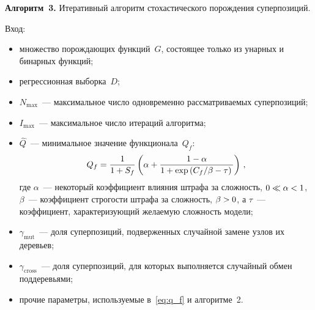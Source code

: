 \begin{multicols}{2}
\noindent
\textbf{Алгоритм~3.}
  Итеративный алгоритм стохастического порождения суперпозиций.

  Вход:
  \begin{itemize}
    \item множество порождающих функций~$G$, со\-сто\-ящее только из унарных
      и бинарных функций;
    \item регрессионная выборка~$D$;
    \item $N_{\max}$~--- максимальное число одновременно рассматриваемых
      суперпозиций;
    \item $I_{\max}$~--- максимальное число итераций алгоритма;
    \item $\hat{Q}$~--- минимальное значение функционала~$Q_f$:
    \begin{equation}
  \label{eq:q_f}
  Q_f = \displaystyle\frac{\displaystyle 1\mathstrut}{\displaystyle 1 + S_f\mathstrut} \left(\alpha + \displaystyle\frac{\displaystyle 1 - \alpha\mathstrut}{\displaystyle 1 + \exp \left({C_f}/{\beta} - \tau\right)\mathstrut}\right)\,,
\end{equation}
где $\alpha$~--- некоторый коэффициент влияния штрафа за сложность, $0 \hm\ll \alpha \hm< 1$,
$\beta$~--- коэффициент строгости штрафа за сложность, $\beta \hm> 0$, а
$\tau$~--- коэффициент, характеризующий желаемую сложность модели;
    \item $\gamma_{\mathrm{mut}}$~--- доля суперпозиций, подверженных случайной
      замене узлов их деревьев;
    \item $\gamma_{\mathrm{cross}}$~--- доля суперпозиций, для которых выполняется
      случайный обмен поддеревьями;
    \item прочие параметры, используемые в~\eqref{eq:q_f} и алгоритме~2.
  \end{itemize}



\end{multicols}
